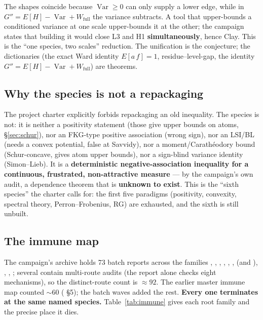 The shapes coincide because $\operatorname{Var}\ge0$ can only supply a lower edge, while in
$G''=E[H]-\operatorname{Var}+W_{\mathrm{full}}$ the variance subtracts. A tool that upper-bounds a conditioned
variance at one scale upper-bounds it at the other; the campaign states that building it would
close L3 and H1 \textbf{simultaneously}, hence Clay. This is the ``one species, two scales''
reduction. The unification is the conjecture; the dictionaries (the exact Ward identity
$E[a\,f]=1$, residue--level-gap, the identity $G''=E[H]-\operatorname{Var}+W_{\mathrm{full}}$) are theorems.

\subsection{Why the species is not a repackaging}

The project charter explicitly forbids repackaging an old inequality. The species is not: it is
neither a positivity statement (those give upper bounds on atoms, \S\ref{sec:schur}), nor an
FKG-type positive association (wrong sign), nor an LSI/BL (needs a convex potential, false at
Savvidy), nor a moment/Carathéodory bound (Schur-concave, gives atom upper bounds), nor a
sign-blind variance identity (Simon--Lieb). It is a \textbf{deterministic negative-association
inequality for a continuous, frustrated, non-attractive measure} --- by the campaign's own audit,
a dependence theorem that is \textbf{unknown to exist}. This is the ``sixth species'' the charter
calls for: the first five paradigms (positivity, convexity, spectral theory,
Perron--Frobenius, RG) are exhausted, and the sixth is still unbuilt.

\subsection{The immune map}

The campaign's archive holds 73 batch reports across the families , ,
, , , ,  (and
), , , ; several contain multi-route
audits (the  report alone checks eight mechanisms), so the distinct-route count is
$\approx92$. The earlier master immune map counted $\sim$60 ( \S5);
the batch waves added the rest. \textbf{Every one terminates at the same named species.}
Table~\ref{tab:immune} gives each root family and the precise place it dies.

